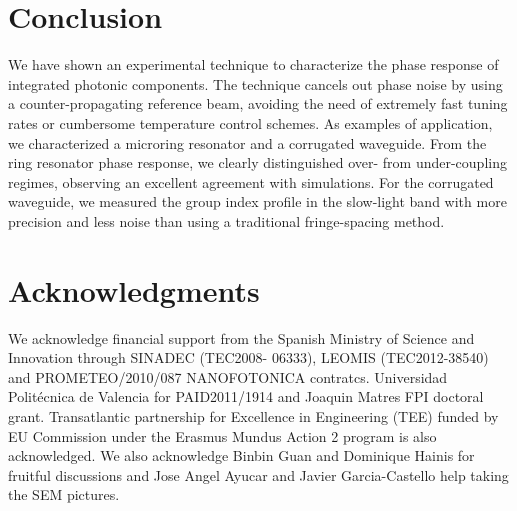 \documentclass[journal]{IEEEtran}
\begin{document}
\section{Conclusion}
We have shown an experimental technique to characterize the phase response of integrated photonic components.
The technique cancels out phase noise by using a counter-propagating reference beam, avoiding the need of extremely fast tuning rates or cumbersome temperature control schemes.
As examples of application, we characterized a microring resonator and a corrugated waveguide.
From the ring resonator phase response, we clearly distinguished over- from under-coupling regimes, observing an excellent agreement with simulations.
For the corrugated waveguide, we measured the group index profile in the slow-light band with more precision and less noise than using a traditional fringe-spacing method.



\section*{Acknowledgments}
We acknowledge financial support from the Spanish Ministry of Science and Innovation through  SINADEC (TEC2008- 06333), LEOMIS (TEC2012-38540) and PROMETEO/2010/087 NANOFOTONICA contratcs. Universidad Polit\'ecnica de Valencia for PAID2011/1914 and  Joaquin Matres FPI doctoral grant. Transatlantic partnership for Excellence in Engineering (TEE) funded by EU Commission under the Erasmus Mundus Action 2 program is also acknowledged.  We also acknowledge Binbin Guan and Dominique Hainis for fruitful discussions and Jose Angel Ayucar and Javier Garcia-Castello help taking the SEM pictures.


% 
% 
\end{document}
